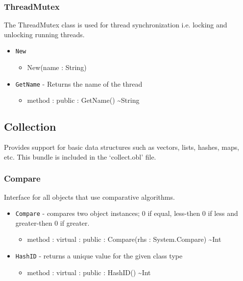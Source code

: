 \documentclass[11pt]{article}
\begin{document}
\subsubsection{ThreadMutex}
The ThreadMutex class is used for thread synchronization i.e. locking
and unlocking running threads.
\begin{itemize}
\item \texttt{New}
  \begin{itemize}
  \item New(name : String)
  \end{itemize}
\item \texttt{GetName} - Returns the name of the thread
  \begin{itemize}
  \item method : public : GetName() \textasciitilde String
  \end{itemize}
\end{itemize}

\subsection{Collection}
Provides support for basic data structures such as vectors, lists,
hashes, maps, etc.  This bundle is included in the `collect.obl' file.

\subsubsection{Compare}
Interface for all objects that use comparative algorithms.
\begin{itemize}
\item \texttt{Compare} - compares two object instances; 0 if equal,
  less-then 0 if less and greater-then 0 if greater.
  \begin{itemize}
  \item method : virtual : public : Compare(rhs : System.Compare)
    \textasciitilde Int
  \end{itemize}
\item \texttt{HashID} - returns a unique value for the given class
  type
  \begin{itemize}
  \item method : virtual : public : HashID() \textasciitilde Int
  \end{itemize}
\end{itemize}
\end{document}
